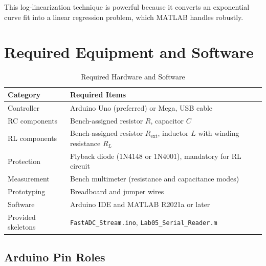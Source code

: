 \documentclass[11pt,letterpaper]{article}
\newcommand{\visualplaceholder}[1]{%
\begin{figure}[H]
    \centering
    \fbox{%
    \begin{minipage}{0.92\textwidth}
        \centering
        \vspace{0.6in}
        \textcolor{red}{\Large\textbf{[#1]}}\\
        \vspace{0.6in}
    \end{minipage}
    }
\end{figure}}
\begin{document}
\noindent
This log-linearization technique is powerful because it converts an exponential curve fit into a linear regression problem, which MATLAB handles robustly.

\visualplaceholder{INSERT DIAGRAM: Step Response vs Impulse Response of a First-Order System (showing 63.2\% at $t=\tau$, decay curves for both, with annotations)}

\clearpage

\section{Required Equipment and Software}

\begin{table}[H]
    \centering
    \caption{Required Hardware and Software}
    \label{tab:equipment}
    \begin{tabularx}{\linewidth}{l X}
    \toprule
    \textbf{Category} & \textbf{Required Items}\\
    \midrule
    Controller & Arduino Uno (preferred) or Mega, USB cable\\
    RC components & Bench-assigned resistor $R$, capacitor $C$\\
    RL components & Bench-assigned resistor $R_{\mathrm{ext}}$, inductor $L$ with winding resistance $R_L$\\
    Protection & Flyback diode (1N4148 or 1N4001), mandatory for RL circuit\\
    Measurement & Bench multimeter (resistance and capacitance modes)\\
    Prototyping & Breadboard and jumper wires\\
    Software & Arduino IDE and MATLAB R2021a or later\\
    Provided skeletons & \texttt{FastADC\_Stream.ino}, \texttt{Lab05\_Serial\_Reader.m}\\
    \bottomrule
    \end{tabularx}
\end{table}

\subsection*{Arduino Pin Roles}
\end{document}

